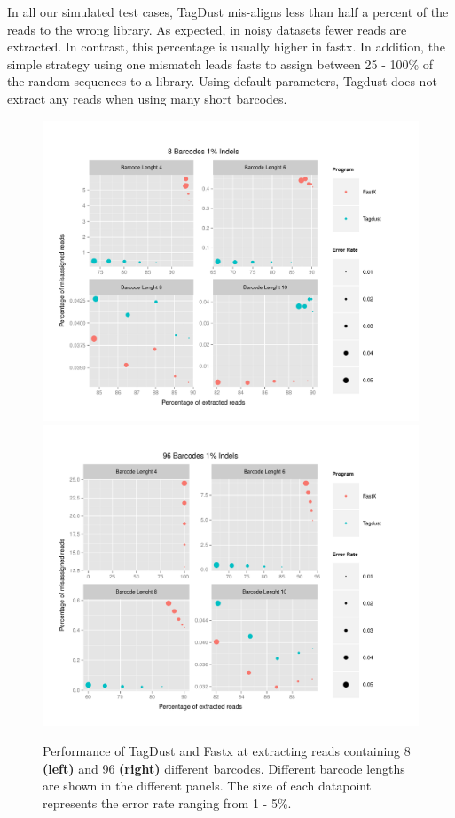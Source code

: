 \documentclass[a4,center,fleqn]{NAR}
\begin{document}
In all our simulated test cases, TagDust mis-aligns less than half a percent of the reads to the wrong library. As expected, in noisy datasets fewer reads are extracted. In contrast, this percentage is usually higher in fastx. In addition, the simple strategy using one mismatch leads fasts to assign between 25 - 100\% of the random sequences to a library. Using default parameters, Tagdust does not extract any reads when using many short barcodes. 

\begin{figure}[t]
\begin{center}
\includegraphics[scale = 0.35]{../figures/8Barcodes1Indels.pdf}
\includegraphics[scale = 0.35]{../figures/96Barcodes1Indels.pdf}
\end{center}
\caption{Performance of TagDust and Fastx at extracting reads containing 8 \textbf{(left)} and 96 \textbf{(right)} different barcodes. Different barcode lengths are shown in the different panels. The size of each datapoint represents the error rate ranging from 1 - 5\%.
}
\label{figure2}
\end{figure}
\end{document}
